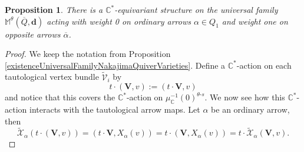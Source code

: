 \documentclass[10pt,a4paper]{amsart}
\newtheorem{proposition}{Proposition}
\begin{document}
	\begin{proposition}\label{equivariantStructureUniversalFamily}
		There is a $\mathbb{C}^*$-equivariant structure on the universal family $\mathbb{M}^{\theta}(\overline{Q},\mathbf{d})$ acting with weight 0 on ordinary arrows
		$\alpha\in Q_1$ and weight one on opposite arrows $\overline\alpha$. 
	\end{proposition}

	\begin{proof}
		We keep the notation from Proposition \ref{existenceUniversalFamilyNakajimaQuiverVarieties}. Define a $\mathbb C^*$-action on each tautological vertex bundle $\widetilde{\mathcal{V}}_i$ by
		$$
		t\cdot(\mathbf{V},v):=(t\cdot \mathbf{V},v)
		$$
		and notice that this covers the $\mathbb C^*$-action on $\mu_{\mathbb{C}}^{-1}(0)^{\theta\text{-}s}$. We now see how this $\mathbb{C}^*$-action interacts with the tautological arrow maps. Let
		$\alpha$ be an ordinary arrow, then
		\begin{equation}\label{equivarianceArrowsBeforeDescending}
			\widetilde{\mathcal{X}}_\alpha(t\cdot(\mathbf{V},v))=(t\cdot\mathbf{V},X_{\alpha}(v))=t\cdot(\mathbf{V},X_{\alpha}(v))=t\cdot \widetilde{\mathcal{X}}_{\alpha}(\mathbf{V},v).
		\end{equation}
		

\end{proof}
\end{document}
